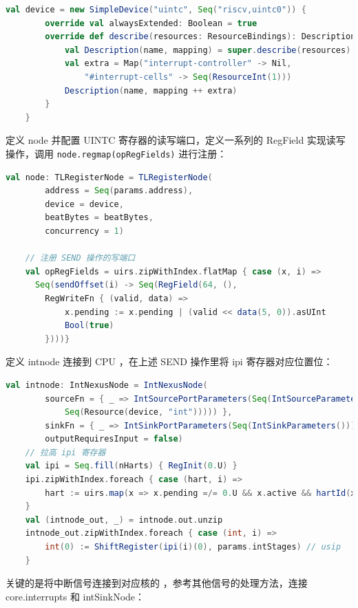 \begin{lstlisting}[style=CStyle,language=scala]
    val device = new SimpleDevice("uintc", Seq("riscv,uintc0")) {
        override val alwaysExtended: Boolean = true
        override def describe(resources: ResourceBindings): Description = {
            val Description(name, mapping) = super.describe(resources)
            val extra = Map("interrupt-controller" -> Nil,
                "#interrupt-cells" -> Seq(ResourceInt(1)))
            Description(name, mapping ++ extra)
        }
    }
\end{lstlisting}

定义 node 并配置 UINTC 寄存器的读写端口，定义一系列的 RegField 实现读写操作，调用 \texttt{node.regmap(opRegFields)} 进行注册：

\begin{lstlisting}[style=CStyle,language=scala]
    val node: TLRegisterNode = TLRegisterNode(
        address = Seq(params.address),
        device = device,
        beatBytes = beatBytes,
        concurrency = 1)

    // 注册 SEND 操作的写端口
    val opRegFields = uirs.zipWithIndex.flatMap { case (x, i) =>
      Seq(sendOffset(i) -> Seq(RegField(64, (),
        RegWriteFn { (valid, data) =>
            x.pending := x.pending | (valid << data(5, 0)).asUInt
            Bool(true)
        })))}
\end{lstlisting}

定义 intnode 连接到 CPU ，在上述 SEND 操作里将 ipi 寄存器对应位置位：

\begin{lstlisting}[style=CStyle,language=scala]
    val intnode: IntNexusNode = IntNexusNode(
        sourceFn = { _ => IntSourcePortParameters(Seq(IntSourceParameters(1,
            Seq(Resource(device, "int"))))) },
        sinkFn = { _ => IntSinkPortParameters(Seq(IntSinkParameters())) },
        outputRequiresInput = false)
    // 拉高 ipi 寄存器
    val ipi = Seq.fill(nHarts) { RegInit(0.U) }
    ipi.zipWithIndex.foreach { case (hart, i) =>
        hart := uirs.map(x => x.pending =/= 0.U && x.active && hartId(x.hartid) === i.asUInt).reduce(_ || _)
    }
    val (intnode_out, _) = intnode.out.unzip
    intnode_out.zipWithIndex.foreach { case (int, i) =>
        int(0) := ShiftRegister(ipi(i)(0), params.intStages) // usip
    }
\end{lstlisting}

关键的是将中断信号连接到对应核的 \FcsrUipUsip ，参考其他信号的处理方法，连接 core.interrupts 和 intSinkNode：

